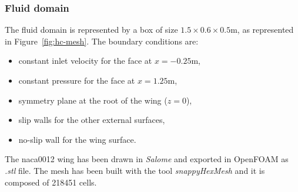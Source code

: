 \subsubsection{Fluid domain}

The fluid domain is represented by a box of size $1.5\times 0.6\times 0.5$\si{m}, as represented in Figure~\ref{fig:hc-mesh}. The boundary conditions are:

\begin{itemize}
    \item constant inlet velocity for the face at $x=-0.25$\si{m},
    \item constant pressure for the face at $x=1.25$\si{m},
    \item symmetry plane at the root of the wing ($z=0$),
    \item slip walls for the other external surfaces,
    \item no-slip wall for the wing surface.
\end{itemize}

The naca0012 wing has been drawn in \textit{Salome} and exported in OpenFOAM as \textit{.stl} file. The mesh has been built with the tool \textit{snappyHexMesh} and it is composed of 218451 cells. 



